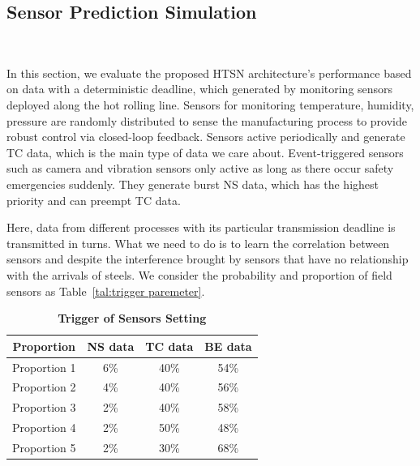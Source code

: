 \documentclass{SCIS2021}
\begin{document}
	\subsection{Sensor Prediction Simulation}~{}
	\par In this section, we evaluate the proposed HTSN architecture's performance based on data with a deterministic deadline, which generated by monitoring sensors deployed along the hot rolling line. Sensors for monitoring temperature, humidity, pressure are randomly distributed to sense the manufacturing process to provide robust control via closed-loop feedback. Sensors active periodically and generate TC data, which is the main type of data we care about. Event-triggered sensors such as camera and vibration sensors only active as long as there occur safety emergencies suddenly. They generate burst NS data, which has the highest priority and can preempt TC data.
	\par Here, data from different processes with its particular transmission deadline is transmitted in turns. What we need to do is to learn the correlation between sensors and despite the interference brought by sensors that have no relationship with the arrivals of steels. We consider the probability and proportion of field sensors as Table~\ref{tal:trigger paremeter}.
	\begin{table}[b]
		\footnotesize
		\caption{\textbf{Trigger of Sensors Setting}}
		\label{tal:trigger paremeter}
		\label{tab1}
		\tabcolsep 38pt %
		\begin{tabular*}{\textwidth}{cccc}
			\toprule
			\textbf{Proportion} & \textbf{NS data} & \textbf{TC data} & \textbf{BE data}\\\hline
			Proportion 1 & 6\% & 40\% & 54\% \\
			Proportion 2 & 4\% & 40\% & 56\% \\
			Proportion 3 & 2\% & 40\% & 58\% \\
			Proportion 4 & 2\% & 50\% & 48\% \\
			Proportion 5 & 2\% & 30\% & 68\% \\
			\bottomrule
		\end{tabular*}
	\end{table}
	
\end{document}
